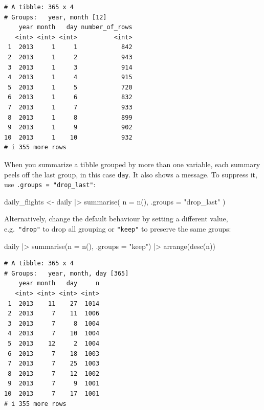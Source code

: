\documentclass[
  letterpaper,
  DIV=11,
  numbers=noendperiod]{scrreprt}
\newenvironment{Shaded}{\begin{snugshade}}{\end{snugshade}}
\newcommand{\AttributeTok}[1]{\textcolor[rgb]{0.40,0.45,0.13}{#1}}
\newcommand{\FunctionTok}[1]{\textcolor[rgb]{0.28,0.35,0.67}{#1}}
\newcommand{\NormalTok}[1]{\textcolor[rgb]{0.00,0.23,0.31}{#1}}
\newcommand{\OtherTok}[1]{\textcolor[rgb]{0.00,0.23,0.31}{#1}}
\newcommand{\SpecialCharTok}[1]{\textcolor[rgb]{0.37,0.37,0.37}{#1}}
\newcommand{\StringTok}[1]{\textcolor[rgb]{0.13,0.47,0.30}{#1}}
\begin{document}
\begin{verbatim}
# A tibble: 365 x 4
# Groups:   year, month [12]
    year month   day number_of_rows
   <int> <int> <int>          <int>
 1  2013     1     1            842
 2  2013     1     2            943
 3  2013     1     3            914
 4  2013     1     4            915
 5  2013     1     5            720
 6  2013     1     6            832
 7  2013     1     7            933
 8  2013     1     8            899
 9  2013     1     9            902
10  2013     1    10            932
# i 355 more rows
\end{verbatim}

When you summarize a tibble grouped by more than one variable, each
summary peels off the last group, in this case \texttt{day}. It also
shows a message. To suppress it, use \texttt{.groups\ =\ "drop\_last"}:

\begin{Shaded}
\begin{Highlighting}[]
\NormalTok{daily\_flights }\OtherTok{\textless{}{-}}\NormalTok{ daily }\SpecialCharTok{|\textgreater{}}
  \FunctionTok{summarise}\NormalTok{(}
    \AttributeTok{n =} \FunctionTok{n}\NormalTok{(),}
    \AttributeTok{.groups =} \StringTok{"drop\_last"}
\NormalTok{  )}
\end{Highlighting}
\end{Shaded}

Alternatively, change the default behaviour by setting a different
value, e.g.~\texttt{"drop"} to drop all grouping or \texttt{"keep"} to
preserve the same groups:

\begin{Shaded}
\begin{Highlighting}[]
\NormalTok{daily }\SpecialCharTok{|\textgreater{}}
  \FunctionTok{summarise}\NormalTok{(}\AttributeTok{n =} \FunctionTok{n}\NormalTok{(), }\AttributeTok{.groups =} \StringTok{"keep"}\NormalTok{) }\SpecialCharTok{|\textgreater{}}
  \FunctionTok{arrange}\NormalTok{(}\FunctionTok{desc}\NormalTok{(n))}
\end{Highlighting}
\end{Shaded}

\begin{verbatim}
# A tibble: 365 x 4
# Groups:   year, month, day [365]
    year month   day     n
   <int> <int> <int> <int>
 1  2013    11    27  1014
 2  2013     7    11  1006
 3  2013     7     8  1004
 4  2013     7    10  1004
 5  2013    12     2  1004
 6  2013     7    18  1003
 7  2013     7    25  1003
 8  2013     7    12  1002
 9  2013     7     9  1001
10  2013     7    17  1001
# i 355 more rows
\end{verbatim}
\end{document}
